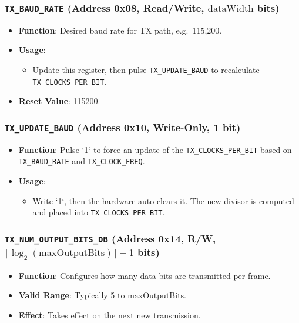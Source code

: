 \subsubsection{\texttt{TX\_BAUD\_RATE} (Address 0x08, Read/Write, \(\text{dataWidth}\) bits)}
\begin{itemize}[noitemsep]
\item \textbf{Function}: Desired baud rate for TX path, e.g.\ 115,200.
\item \textbf{Usage}:
  \begin{itemize}[noitemsep]
  \item Update this register, then pulse \texttt{TX\_UPDATE\_BAUD} to recalculate \texttt{TX\_CLOCKS\_PER\_BIT}.
  \end{itemize}
\item \textbf{Reset Value}: 115200.
\end{itemize}

\subsubsection{\texttt{TX\_UPDATE\_BAUD} (Address 0x10, Write-Only, 1 bit)}
\begin{itemize}[noitemsep]
\item \textbf{Function}: Pulse `1` to force an update of the \texttt{TX\_CLOCKS\_PER\_BIT} based on \texttt{TX\_BAUD\_RATE} and \texttt{TX\_CLOCK\_FREQ}.
\item \textbf{Usage}:
  \begin{itemize}[noitemsep]
  \item Write `1`, then the hardware auto-clears it. The new divisor is computed and placed into \texttt{TX\_CLOCKS\_PER\_BIT}.
  \end{itemize}
\end{itemize}

\subsubsection{\texttt{TX\_NUM\_OUTPUT\_BITS\_DB} (Address 0x14, R/W, \(\lceil\log_2(\text{maxOutputBits})\rceil +1\) bits)}
\begin{itemize}[noitemsep]
\item \textbf{Function}: Configures how many data bits are transmitted per frame.
\item \textbf{Valid Range}: Typically 5 to \(\text{maxOutputBits}\).
\item \textbf{Effect}: Takes effect on the next new transmission.
\end{itemize}

